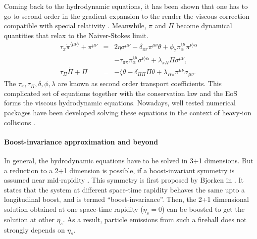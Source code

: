 Coming back to the hydrodynamic equations, it has been shown that one has to go to second order in the gradient expansion to the render the viscous correction compatible with special relativity \cite{ISRAEL1976310}.
Meanwhile, $\pi$ and $\Pi$ become dynamical quantities that relax to the Naiver-Stokes limit.
\begin{eqnarray}
\tau_\pi \dot{\pi}^{\langle\mu\nu\rangle}+\pi^{\mu\nu} &=& 2\eta\sigma^{\mu\nu}- \delta_{\pi\pi}\pi^{\mu\nu}\theta + \phi_7 \pi_{\alpha}^{\langle\mu}\pi^{\nu\rangle\alpha}\\ 
\nonumber
&& -\tau_{\pi\pi}\pi_{\alpha}^{\langle\mu}\sigma^{\nu\rangle\alpha} + \lambda_{\pi\Pi}\Pi\sigma^{\mu\nu},
\\
\tau_{\Pi}\dot{\Pi} + \Pi &=& -\zeta\theta - \delta_{\Pi\Pi}\Pi\theta + \lambda_{\Pi\pi}\pi^{\mu\nu}\sigma_{\mu\nu}.
\end{eqnarray}
The $\tau_\pi, \tau_\Pi, \delta, \phi, \lambda$ are known as second order transport coefficients.
This complicated set of equations together with the conservation law and the EoS forms the viscous hydrodynamic equations.
Nowadays, well tested numerical packages have been developed solving these equations in the context of heavy-ion collisions \cite{Song:2007ux,Shen:2014vra,Schenke:2010nt,Karpenko:2013wva}.

\paragraph{Boost-invariance approximation and beyond}
In general, the hydrodynamic equations have to be solved in 3+1 dimensions.
But a reduction to a 2+1 dimension is possible, if a boost-invariant symmetry is assumed near mid-rapidity \cite{Miller:2007ri, Drescher:2006ca, Schenke:2012wb, Niemi:2015qia, Moreland:2014oya, Chatterjee:2015aja}.
This symmetry is first proposed by Bjorken in \cite{PhysRevD.27.140}.
It states that the system at different space-time rapidity behaves the same upto a longitudinal boost, and is termed ``boost-invariance''.
Then, the 2+1 dimensional solution obtained at one space-time rapidity ($\eta_s = 0$) can be boosted to get the solution at other $\eta_s$.
As a result, particle emissions from such a fireball does not strongly depends on $\eta_s$.

